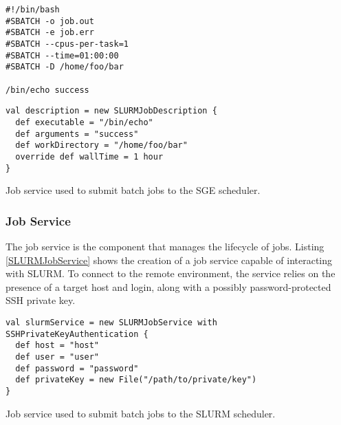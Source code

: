 \begin{listing}[h]
	\centering
	\begin{minipage}[b]{5.03cm}
		\begin{verbatim}
#!/bin/bash
#SBATCH -o job.out
#SBATCH -e job.err
#SBATCH --cpus-per-task=1 
#SBATCH --time=01:00:00
#SBATCH -D /home/foo/bar

/bin/echo success
        \end{verbatim}
	\end{minipage}
	\hspace{0.5cm}
    \begin{minipage}[b]{8.29cm}
		\begin{verbatim}
val description = new SLURMJobDescription { 
  def executable = "/bin/echo"
  def arguments = "success"
  def workDirectory = "/home/foo/bar"
  override def wallTime = 1 hour
}
		\end{verbatim}
	\end{minipage}
	\caption{Job service used to submit batch jobs to the SGE scheduler.}
	\label{SLURMJobDescription}
\end{listing}

\subsubsection{Job Service}

The job service is the component that manages the lifecycle of jobs. Listing \ref{SLURMJobService} shows the creation of a job service capable of interacting with SLURM. To connect to the remote environment, the service relies on the presence of a target host and login, along with a possibly password-protected SSH private key.

\begin{listing}[h]
	\centering
	\begin{minipage}{14cm}
		\begin{verbatim}
val slurmService = new SLURMJobService with SSHPrivateKeyAuthentication {
  def host = "host"
  def user = "user"
  def password = "password"
  def privateKey = new File("/path/to/private/key")
}
		\end{verbatim}
	\end{minipage}
	\caption{Job service used to submit batch jobs to the SLURM scheduler.}
	\label{SLURMJobService}
\end{listing}

